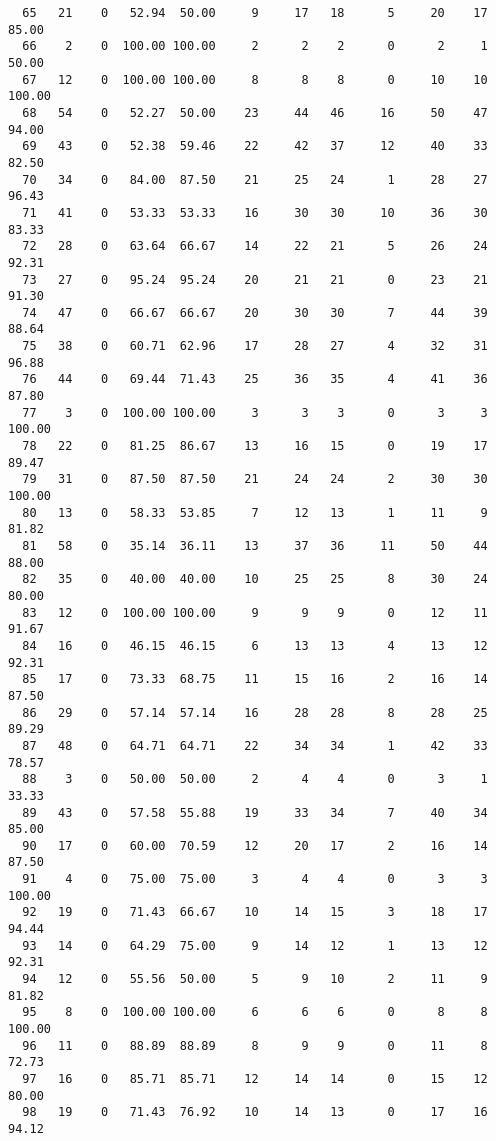\begin{verbatim}
  65   21    0   52.94  50.00     9     17   18      5     20    17    85.00
  66    2    0  100.00 100.00     2      2    2      0      2     1    50.00
  67   12    0  100.00 100.00     8      8    8      0     10    10   100.00
  68   54    0   52.27  50.00    23     44   46     16     50    47    94.00
  69   43    0   52.38  59.46    22     42   37     12     40    33    82.50
  70   34    0   84.00  87.50    21     25   24      1     28    27    96.43
  71   41    0   53.33  53.33    16     30   30     10     36    30    83.33
  72   28    0   63.64  66.67    14     22   21      5     26    24    92.31
  73   27    0   95.24  95.24    20     21   21      0     23    21    91.30
  74   47    0   66.67  66.67    20     30   30      7     44    39    88.64
  75   38    0   60.71  62.96    17     28   27      4     32    31    96.88
  76   44    0   69.44  71.43    25     36   35      4     41    36    87.80
  77    3    0  100.00 100.00     3      3    3      0      3     3   100.00
  78   22    0   81.25  86.67    13     16   15      0     19    17    89.47
  79   31    0   87.50  87.50    21     24   24      2     30    30   100.00
  80   13    0   58.33  53.85     7     12   13      1     11     9    81.82
  81   58    0   35.14  36.11    13     37   36     11     50    44    88.00
  82   35    0   40.00  40.00    10     25   25      8     30    24    80.00
  83   12    0  100.00 100.00     9      9    9      0     12    11    91.67
  84   16    0   46.15  46.15     6     13   13      4     13    12    92.31
  85   17    0   73.33  68.75    11     15   16      2     16    14    87.50
  86   29    0   57.14  57.14    16     28   28      8     28    25    89.29
  87   48    0   64.71  64.71    22     34   34      1     42    33    78.57
  88    3    0   50.00  50.00     2      4    4      0      3     1    33.33
  89   43    0   57.58  55.88    19     33   34      7     40    34    85.00
  90   17    0   60.00  70.59    12     20   17      2     16    14    87.50
  91    4    0   75.00  75.00     3      4    4      0      3     3   100.00
  92   19    0   71.43  66.67    10     14   15      3     18    17    94.44
  93   14    0   64.29  75.00     9     14   12      1     13    12    92.31
  94   12    0   55.56  50.00     5      9   10      2     11     9    81.82
  95    8    0  100.00 100.00     6      6    6      0      8     8   100.00
  96   11    0   88.89  88.89     8      9    9      0     11     8    72.73
  97   16    0   85.71  85.71    12     14   14      0     15    12    80.00
  98   19    0   71.43  76.92    10     14   13      0     17    16    94.12

\end{verbatim}
